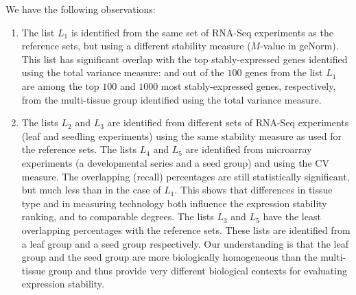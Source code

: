 		We have the following observations:
		\begin{enumerate}
			\item
			The list $L_1$ is identified from the same set of RNA-Seq experiments as the
			reference sets, but using a different stability measure ($M$-value in
			geNorm). This list has significant overlap with the top
			stably-expressed genes identified using the total variance measure:
			\recalltophundred and \recalltopthousand out of the $100$ genes from the list $L_1$ are among the
			top $100$ and $1000$ most stably-expressed genes, respectively, from the
			multi-tissue group identified using the total variance measure. 
			\item
			The lists $L_2$ and $L_3$ are identified from different sets of
			RNA-Seq experiments (leaf and seedling experiments) using the same
			stability measure as used for the reference sets. The lists $L_4$ and $L_5$ are
			identified from microarray experiments (a developmental series and a
			seed group) and using the CV measure. The overlapping (recall)
			percentages are still statistically significant, but much less than in
			the case of $L_1$.  This shows that differences in tissue type and in
			measuring technology both influence the expression stability ranking,
			and to comparable degrees. The lists $L_3$ and $L_5$ have the least
			overlapping percentages with the reference sets. These lists are
			identified from a leaf group and a seed group respectively.
			Our understanding is that the leaf group and the seed group are more
			biologically homogeneous than the multi-tissue group and thus provide
			very different biological contexts for evaluating expression stability.
		\end{enumerate}
		
		
		
